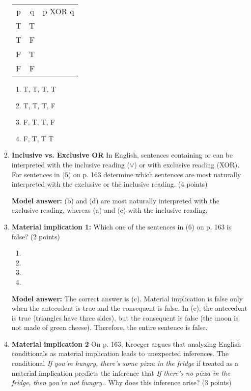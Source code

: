 \documentclass[a4,11pt]{article}
\newcommand{\6}{\mbox{$[\hspace*{-.6mm}[$}}
\newcommand{\9}{\mbox{$]\hspace*{-.6mm}]$}}
\begin{document}
\begin{enumerate}[leftmargin = 12pt]
\begin{tabular}{ccc}
p & q & p XOR q \\
T & T & \\
T & F & \\
F & T& \\
F & F & \\
\end{tabular}

\begin{enumerate}[noitemsep]
\item T, T, T, T
\item T, T, T, F
\item F, T, T, F
\item F, T, T T
\end{enumerate}

\item { \bf  Inclusive vs. Exclusive OR} In English, sentences containing or can be interpreted with the inclusive reading ($\lor$) or with exclusive reading (XOR). For sentences in (5) on p. 163 determine which sentences are most naturally interpreted with the exclusive or the inclusive reading. (4 points)

{ \bf Model answer:}  (b) and (d) are most naturally interpreted with the exclusive reading, whereas (a) and (c) with the inclusive reading.

\item { \bf  Material implication 1:} Which one of the sentences in (6) on p. 163 is false? (2 points)

\begin{enumerate}[noitemsep]
\item 
\item 
\item 
\item 
\end{enumerate}

{ \bf Model answer:}  The correct answer is (c). Material implication is false only when the antecedent is true and the consequent is false. In (c), the antecedent is true (triangles have three sides), but the consequent is false (the moon is not made of green cheese). Therefore, the entire sentence is false.

\item { \bf  Material implication 2} On p. 163, Kroeger argues that analyzing English conditionals as material implication leads to  unexpected inferences. The conditional {\it If you’re hungry, there’s some pizza in the fridge} if treated as a material implication predicts the inference that {\it If there’s no pizza in the fridge, then you’re not hungry.}. Why does this inference arise? (3 points)


\end{enumerate}
\end{document}
